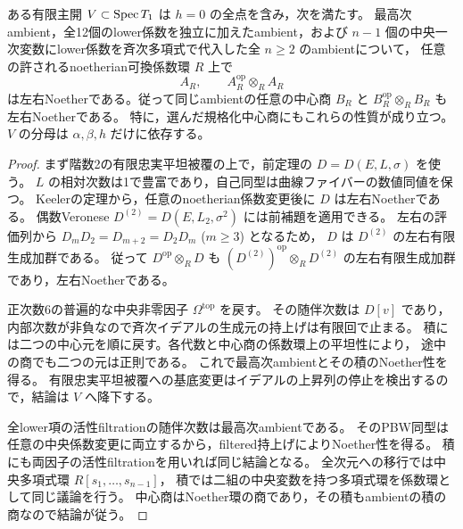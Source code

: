 \begin{theorem}\label{thm:degree-one-all-top-noether}
ある有限主開 $V\subset\operatorname{Spec} T_1$ は $h=0$ の全点を含み，次を満たす。
最高次ambient，全12個のlower係数を独立に加えたambient，および
$n-1$ 個の中央一次変数にlower係数を斉次多項式で代入した全 $n\ge2$ のambientについて，
任意の許されるnoetherian可換係数環 $R$ 上で
\[
 A_R,\qquad A_R^{\mathrm{op}}\otimes_R A_R
\]
は左右Noetherである。従って同じambientの任意の中心商 $B_R$ と
$B_R^{\mathrm{op}}\otimes_R B_R$ も左右Noetherである。
特に，選んだ規格化中心商にもこれらの性質が成り立つ。
$V$ の分母は $\alpha,\beta,h$ だけに依存する。
\end{theorem}
\begin{proof}
まず階数2の有限忠実平坦被覆の上で，前定理の $D=D(E,L,\sigma)$ を使う。
$L$ の相対次数は1で豊富であり，自己同型は曲線ファイバーの数値同値を保つ。
Keelerの定理から，任意のnoetherian係数変更後に $D$ は左右Noetherである。
偶数Veronese $D^{(2)}=D(E,L_2,\sigma^2)$ には前補題を適用できる。
左右の評価列から
$D_mD_2=D_{m+2}=D_2D_m$ ($m\ge3$) となるため，
$D$ は $D^{(2)}$ の左右有限生成加群である。
従って $D^{\mathrm{op}}\otimes_R D$ も
$(D^{(2)})^{\mathrm{op}}\otimes_R D^{(2)}$ の左右有限生成加群であり，左右Noetherである。

正次数6の普遍的な中央非零因子 $\Omega^{\mathrm{top}}$ を戻す。
その随伴次数は $D[v]$ であり，内部次数が非負なので斉次イデアルの生成元の持上げは有限回で止まる。
積には二つの中心元を順に戻す。各代数と中心商の係数環上の平坦性により，
途中の商でも二つの元は正則である。
これで最高次ambientとその積のNoether性を得る。
有限忠実平坦被覆への基底変更はイデアルの上昇列の停止を検出するので，結論は $V$ へ降下する。

全lower項の活性filtrationの随伴次数は最高次ambientである。
そのPBW同型は任意の中央係数変更に両立するから，filtered持上げによりNoether性を得る。
積にも両因子の活性filtrationを用いれば同じ結論となる。
全次元への移行では中央多項式環 $R[s_1,\ldots,s_{n-1}]$，
積では二組の中央変数を持つ多項式環を係数環として同じ議論を行う。
中心商はNoether環の商であり，その積もambientの積の商なので結論が従う。
\end{proof}

